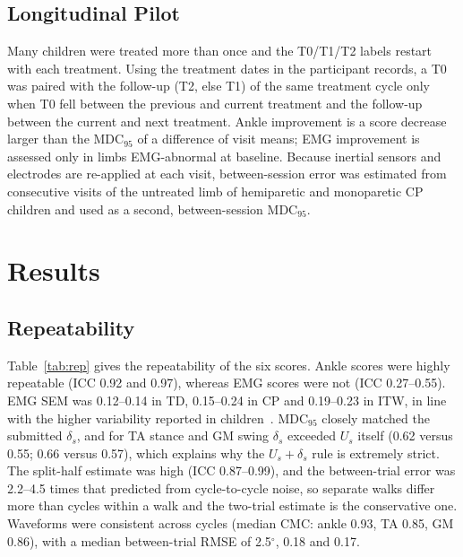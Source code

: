 \documentclass[conference]{IEEEtran}
\newcommand{\rone}[1]{{\color{rI}#1}}
\newcommand{\rtwo}[1]{{\color{rII}#1}}
\newcommand{\rthree}[1]{{\color{rIII}#1}}
\newcommand{\rfour}[1]{{\color{rIV}#1}}
\newcommand{\rone}[1]{#1}
\newcommand{\rtwo}[1]{#1}
\newcommand{\rthree}[1]{#1}
\newcommand{\rfour}[1]{#1}
\begin{document}
\subsection{Longitudinal Pilot}
Many children were treated more than once and the T0/T1/T2 labels restart with each treatment. Using the treatment dates in the participant records, a T0 was paired with the follow-up (T2, else T1) of the same treatment cycle only when T0 fell between the previous and current treatment and the follow-up between the current and next treatment. \rone{Ankle improvement is a score decrease larger than the MDC$_{95}$ of a difference of visit means; EMG improvement is assessed only in limbs EMG-abnormal at baseline.} \rthree{Because inertial sensors and electrodes are re-applied at each visit, between-session error was estimated from consecutive visits of the untreated limb of hemiparetic and monoparetic CP children and used as a second, between-session MDC$_{95}$.}

\section{Results}
\subsection{Repeatability}
\rone{Table~\ref{tab:rep} gives the repeatability of the six scores. Ankle scores were highly repeatable (ICC 0.92 and 0.97), whereas EMG scores were not (ICC 0.27--0.55).} \rfour{EMG SEM was 0.12--0.14 in TD, 0.15--0.24 in CP and 0.19--0.23 in ITW, in line with the higher variability reported in children~\cite{granata2005repeat}.} \rtwo{MDC$_{95}$ closely matched the submitted $\delta_s$, and for TA stance and GM swing $\delta_s$ exceeded $U_s$ itself (0.62 versus 0.55; 0.66 versus 0.57), which explains why the $U_s+\delta_s$ rule is extremely strict.} \rone{The split-half estimate was high (ICC 0.87--0.99), and the between-trial error was 2.2--4.5 times that predicted from cycle-to-cycle noise, so separate walks differ more than cycles within a walk and the two-trial estimate is the conservative one.} \rtwo{Waveforms were consistent across cycles (median CMC: ankle 0.93, TA 0.85, GM 0.86), with a median between-trial RMSE of 2.5$^\circ$, 0.18 and 0.17.}

\begin{table}[t]
\centering
\caption{\rtwo{Within-session repeatability (146 visit-limbs, 50 children; 95\% child-bootstrap CI), submitted threshold $\delta_s$, TD normal limit $U_s$ and strict-rule margin $m_s$ for a two-trial visit. EMG in units of cycle-mean activation}}
\label{tab:rep}
\footnotesize
\rtwo{}
\end{table}
\end{document}
